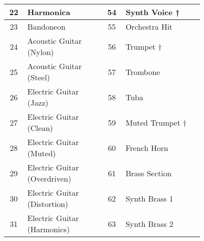 \begin{tabular}{|c|p{0.4\linewidth}|c|p{0.4\linewidth}|}
	22  &  Harmonica  & 54  &  Synth Voice † \\ \hline
	23  &  Bandoneon  & 55  &  Orchestra Hit  \\ \hline
	24  &  Acoustic Guitar (Nylon)  & 56  &  Trumpet † \\ \hline
	25  &  Acoustic Guitar (Steel)  & 57  &  Trombone  \\ \hline
	26  &  Electric Guitar (Jazz)  & 58  &  Tuba  \\ \hline
	27  &  Electric Guitar (Clean)  & 59  &  Muted Trumpet † \\ \hline
	28  &  Electric Guitar (Muted)  & 60  &  French Horn  \\ \hline
	29  &  Electric Guitar (Overdriven)  & 61  &  Brass Section  \\ \hline
	30  &  Electric Guitar (Distortion)  & 62  &  Synth Brass 1  \\ \hline
	31  &  Electric Guitar (Harmonics)  & 63  &  Synth Brass 2  \\ \hline
\end{tabular}

